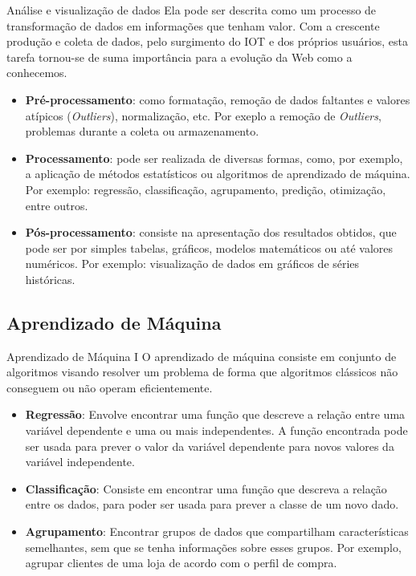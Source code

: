 \begin{frame}{Análise e visualização de dados}
	\quad  Ela pode ser descrita como um processo de transformação de dados em informações que tenham valor. Com a crescente produção e coleta de dados, pelo surgimento do IOT e dos próprios usuários, esta tarefa tornou-se de suma importância para a evolução da Web como a conhecemos.

	\begin{itemize}
		\item \textbf{Pré-processamento}: como formatação, remoção de dados faltantes e valores atípicos (\textit{Outliers}), normalização, etc. Por exeplo a remoção de \textit{Outliers}, problemas durante a coleta ou armazenamento.
		\item \textbf{Processamento}: pode ser realizada de diversas formas, como, por exemplo, a aplicação de métodos estatísticos ou algoritmos de aprendizado de máquina. Por exemplo: regressão, classificação, agrupamento, predição, otimização, entre outros.
		\item \textbf{Pós-processamento}: consiste na apresentação dos resultados obtidos, que pode ser por simples tabelas, gráficos, modelos matemáticos ou até valores numéricos. Por exemplo: visualização de dados em gráficos de séries históricas.
	\end{itemize}
\end{frame}

\subsection{Aprendizado de Máquina}
\label{subsec:aprendizado-de-maquina}

\begin{frame}{Aprendizado de Máquina I}
	\quad O aprendizado de máquina consiste em conjunto de algoritmos visando resolver um problema de forma que algoritmos clássicos não conseguem ou não operam eficientemente.

	\begin{itemize}
		\item \textbf{Regressão}: Envolve encontrar uma função que descreve a relação entre uma variável dependente e uma ou mais independentes. A função encontrada pode ser usada para prever o valor da variável dependente para novos valores da variável independente.
		\item \textbf{Classificação}: Consiste em encontrar uma função que descreva a relação entre os dados, para poder ser usada para prever a classe de um novo dado.
		\item \textbf{Agrupamento}: Encontrar grupos de dados que compartilham características semelhantes, sem que se tenha informações sobre esses grupos. Por exemplo, agrupar clientes de uma loja de acordo com o perfil de compra.
	\end{itemize}
\end{frame}

